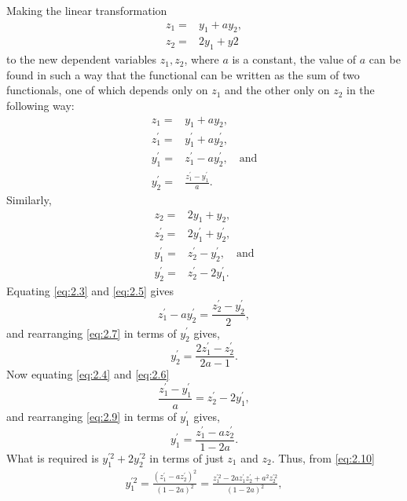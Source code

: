 Making the linear transformation
\begin{align*}
	z_1 =& y_1 + a y_2,\\
	z_2 = & 2y_1 + y2
\end{align*}
to the new dependent variables $z_1, z_2$, where $a$ is a constant, the value of $a$ can be found in such a way that the functional can be written as the sum of two functionals, one of which depends only on $z_1$ and the other only on $z_2$ in the following way:
\begin{align}
	z_1 =& y_1 + a y_2,\nonumber\\
	z_1^\prime =& y_1^\prime + a y_2^\prime,\nonumber\\
	\label{eq:2.3}
	y_1^\prime =& z_1^\prime -ay_2^\prime,\quad \textrm{and} \\
	\label{eq:2.4}
	y_2^\prime =& \frac{z_1^\prime-y_1^\prime}{a}.
\end{align}
Similarly,
\begin{align}
	z_2 =& 2y_1 + y_2,\nonumber\\
	z_2^\prime =& 2y_1^\prime + y_2^\prime,\nonumber\\
	\label{eq:2.5}
	y_1^\prime =& z_2^\prime -y_2^\prime,\quad \textrm{and} \\
	\label{eq:2.6}
	y_2^\prime =& z_2^\prime - 2y_1^\prime.
\end{align}
Equating \eqref{eq:2.3} and \eqref{eq:2.5} gives
\begin{equation}
	\label{eq:2.7}
	z_1^\prime - ay_2^\prime = \frac{z_2^\prime - y_2^\prime}{2},
\end{equation}
and rearranging \eqref{eq:2.7} in terms of $y_2^\prime$ gives,
\begin{equation}
	\label{eq:2.8}
	y_2^\prime = \frac{2z_1^\prime - z_2^\prime}{2a-1}.
\end{equation}
Now equating \eqref{eq:2.4} and \eqref{eq:2.6}
\begin{equation}
	\label{eq:2.9}
	\frac{z_1^\prime - y_1^\prime}{a} = z_2^\prime - 2y_1^\prime,
\end{equation}
and rearranging \eqref{eq:2.9} in terms of $y_1^\prime$ gives,
\begin{equation}
	\label{eq:2.10}
	y_1^\prime = \frac{z_1^\prime - az_2^\prime}{1-2a}.
\end{equation}
What is required is $y_1^{\prime2} + 2y_2^{\prime2}$ in terms of just  $z_1$ and  $z_2$. Thus, from \eqref{eq:2.10}
\begin{align*}
	y_1^{\prime2} = \frac{\left(z_1^\prime - az_2^\prime\right)^2}{\left(1-2a\right)^2} =
	\frac{z_1^{\prime2} - 2az_1^\prime z_2^\prime + a^2 z_2^{\prime2}}{\left(1-2a\right)^2},
\end{align*}
